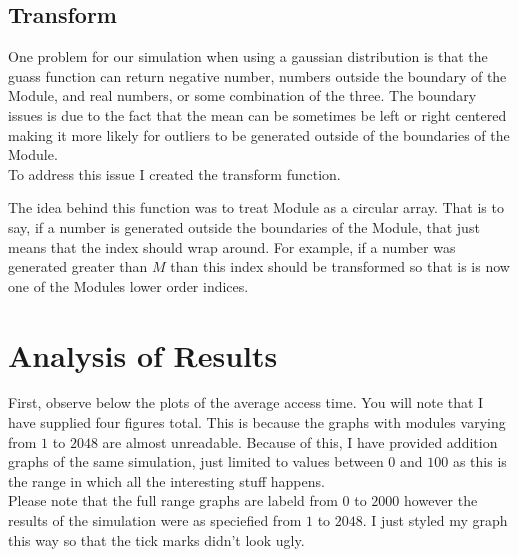 \documentclass[12pt]{article}
\begin{document}
\subsection*{Transform}
One problem for our simulation when using a gaussian distribution is that
the guass function can return negative number, numbers outside
the boundary of the Module, and real numbers, or some combination
of the three. The boundary issues is due to the fact that the mean 
can be sometimes be left or right centered making it more likely for outliers
to be generated outside of the boundaries of the Module. \\
To address this issue I created the transform function. 

The idea behind this function was to treat Module as a circular array. That is to say,
if a number is generated outside the boundaries of the Module, that just means
that the index should wrap around. For example, if a number was generated greater
than $M$ than this index should be transformed so that is is now one of the
Modules lower order indices.

\newpage{}
\section*{Analysis of Results}
First, observe below the plots of the average access time. You will note that
I have supplied four figures total. This is because the graphs with 
modules varying from $1$ to $2048$ are almost unreadable. Because of this,
I have provided addition graphs of the same simulation, just limited to
values between $0$ and $100$ as this is the range in which all the interesting stuff
happens. \\

Please note that the full range graphs are labeld from $0$ to $2000$ however
the results of the simulation were as speciefied from $1$ to $2048$. I just 
styled my graph this way so that the tick marks didn't look ugly.
\end{document}
